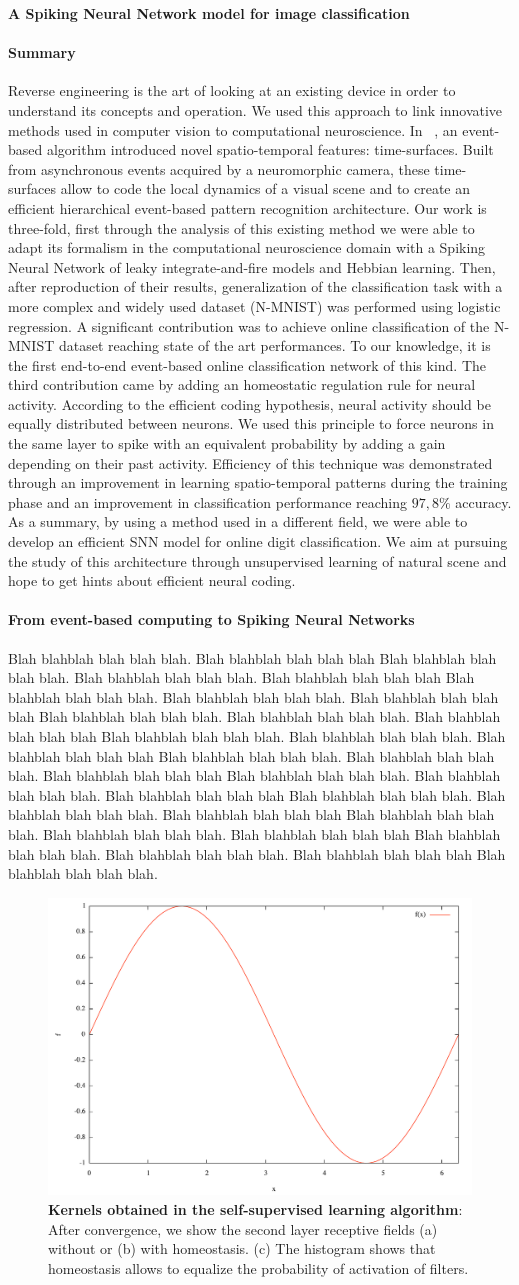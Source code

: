 \documentclass[12pt]{article}
\newcommand{\citet}[1]{\textcite{#1}}
\newcommand{\AuthorAG}{Antoine Grimaldi}
\newcommand{\AuthorLP}{Laurent Perrinet}
\newcommand{\AuthorVB}{Victor Boutin}
\newcommand{\AddressLP}{Institut de Neurosciences de la Timone (UMR 7289); Aix Marseille Univ, CNRS; Marseille, France}%
\newcommand{\AuthorSI}{Sio-Hoi Ieng}
\newcommand{\AuthorRB}{Ryad Benosman}%
\newcommand{\AddressRB}{Sorbonne Université, INSERM, CNRS, Institut de la Vision, France;}%
\newcommand{\Summary}{
Reverse engineering is the art of looking at an existing device in order to understand its concepts and operation. We used this approach to link innovative methods used in computer vision to computational neuroscience. In ~\citet{Lagorce17}, an event-based algorithm introduced novel spatio-temporal features: time-surfaces. Built from asynchronous events acquired by a neuromorphic camera, these time-surfaces allow to code the local dynamics of a visual scene and to create an efficient hierarchical event-based pattern recognition architecture. Our work is three-fold, first through the analysis of this existing method we were able to adapt its formalism in the computational neuroscience domain with a Spiking Neural Network of leaky integrate-and-fire models and Hebbian learning. Then, after reproduction of their results, generalization of the classification task with a more complex and widely used dataset (N-MNIST) was performed using logistic regression. A significant contribution was to achieve online classification of the N-MNIST dataset reaching state of the art performances. To our knowledge, it is the first end-to-end event-based online classification network of this kind. The third contribution came by adding an homeostatic regulation rule for neural activity. According to the efficient coding hypothesis, neural activity should be equally distributed between neurons. We used this principle to force neurons in the same layer to spike with an equivalent probability by adding a gain depending on their past activity. Efficiency of this technique was demonstrated through an improvement in learning spatio-temporal patterns during the training phase and an improvement in classification performance reaching $97,8\%$ accuracy. As a summary, by using a method used in a different field, we were able to develop an efficient SNN model for online digit classification. We aim at pursuing the study of this architecture through unsupervised learning of natural scene and hope to get hints about efficient neural coding.
}
\begin{document}
{\Large\bf
A Spiking Neural Network model for image classification
}

%


\parindent 12pt

\paragraph*{Summary}
\Summary
%
\paragraph*{From event-based computing to Spiking Neural Networks}
Blah blahblah blah blah blah. Blah blahblah blah blah blah Blah blahblah blah blah blah.
Blah blahblah blah blah blah. Blah blahblah blah blah blah Blah blahblah blah blah blah.
Blah blahblah blah blah blah. Blah blahblah blah blah blah Blah blahblah blah blah blah.
Blah blahblah blah blah blah. Blah blahblah blah blah blah Blah blahblah blah blah blah.
Blah blahblah blah blah blah. Blah blahblah blah blah blah Blah blahblah blah blah blah.
Blah blahblah blah blah blah. Blah blahblah blah blah blah Blah blahblah blah blah blah.
Blah blahblah blah blah blah. Blah blahblah blah blah blah Blah blahblah blah blah blah.
Blah blahblah blah blah blah. Blah blahblah blah blah blah Blah blahblah blah blah blah.
Blah blahblah blah blah blah. Blah blahblah blah blah blah Blah blahblah blah blah blah.
Blah blahblah blah blah blah. Blah blahblah blah blah blah Blah blahblah blah blah blah.

\begin{figure}[!ht]%
\includegraphics[width=.99\linewidth, height=.25\linewidth]{figure1.pdf}
\caption
{
\textbf{Kernels obtained in the self-supervised learning algorithm}: After convergence, we show the second layer receptive fields (a) without or (b) with homeostasis.  (c) The histogram shows that homeostasis allows to equalize the probability of activation of filters.
\label{fig:fig1}
}
\end{figure}
\end{document}
